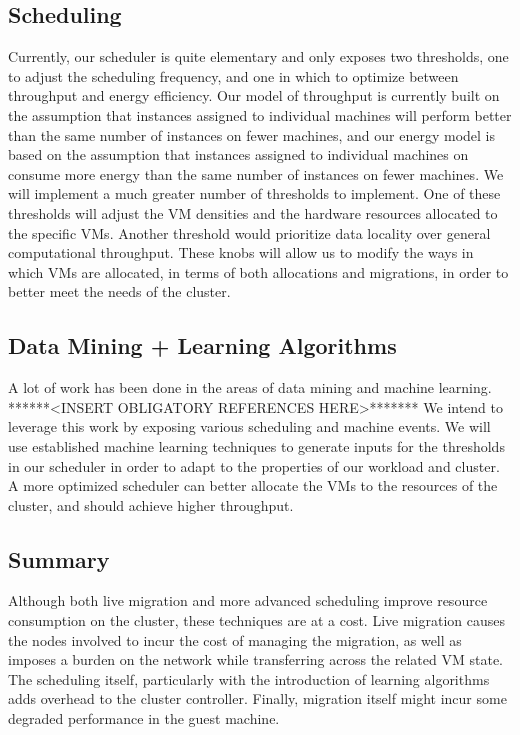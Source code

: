 

\subsection{Scheduling}

Currently, our scheduler is quite elementary and only exposes two thresholds, one to adjust the scheduling frequency, and one in which to optimize between throughput and energy efficiency.  Our model of throughput is currently built on the assumption that instances assigned to individual machines will perform better than the same number of instances on fewer machines, and our energy model is based on the assumption that instances assigned to individual machines on consume more energy than the same number of instances on fewer machines.  We will implement a much greater number of thresholds to implement.  One of these thresholds will adjust the VM densities and the hardware resources allocated to the specific VMs.  Another threshold would prioritize data locality over general computational throughput.  These knobs will allow us to modify the ways in which VMs are allocated, in terms of both allocations and migrations, in order to better meet the needs of the cluster.

\subsection{Data Mining + Learning Algorithms}

A lot of work has been done in the areas of data mining and machine learning. ******<INSERT OBLIGATORY REFERENCES HERE>*******  We intend to leverage this work by exposing various scheduling and machine events.  We will use established machine learning techniques to generate inputs for the thresholds in our scheduler in order to adapt to the properties of our workload and cluster.  A more optimized scheduler can better allocate the VMs to the resources of the cluster, and should achieve higher throughput.

\subsection{Summary}

Although both live migration and more advanced scheduling improve resource consumption on the cluster, these techniques are at a cost.  Live migration causes the nodes involved to incur the cost of managing the migration, as well as imposes a burden on the network while transferring across the related VM state.  The scheduling itself, particularly with the introduction of learning algorithms adds overhead to the cluster controller.  Finally, migration itself might incur some degraded performance in the guest machine.

